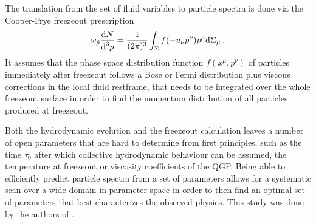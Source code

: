 The translation from the set of fluid variables to particle spectra is done via the Cooper-Frye freezeout prescription \cite{CooperFrye_1974}
\begin{equation}
    \omega_{\vec{p}}\frac{\text{d} N}{\text{d}^3 p}=\frac{1}{(2\pi)^3}\int_\Sigma f(-u_\nu p^\nu)p^\mu\text{d}\Sigma_\mu\,.
\end{equation}
It assumes that the phase space distribution function $f(x^\mu,p^\nu)$ of particles immediately after freezeout follows a Bose or Fermi distribution plus viscous corrections in the local fluid restframe, that needs to be integrated over the whole freezeout surface in order to find the momentum distribution of all particles produced at freezeout.

Both the hydrodynamic evolution and the freezeout calculation leaves a number of open parameters that are hard to determine from first principles, such as the time $\tau_0$ after which collective hydrodynamic behaviour can be assumed, the temperature at freezeout or viscosity coefficients of the QGP. Being able to efficiently predict particle spectra from a set of parameters allows for a systematic scan over a wide domain in parameter space in order to then find an optimal set of parameters that best characterizes the observed physics. This study was done by the authors of \cite{KirchnerEtAl_2023}.